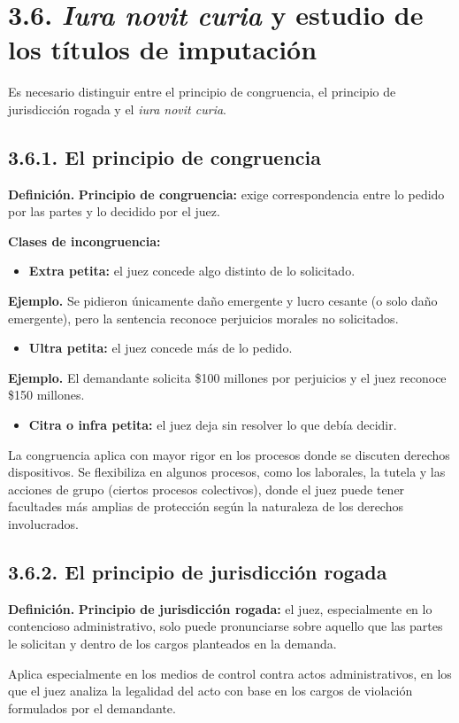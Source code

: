 \section{3.6. \textit{Iura novit curia} y estudio de los títulos de imputación}
Es necesario distinguir entre el principio de congruencia, el principio de jurisdicción rogada y el \textit{iura novit curia}.

\subsection{3.6.1. El principio de congruencia}
\begin{definicion}
\textcolor[HTML]{1F3864}{\textbf{Definición. }}\textbf{Principio de congruencia: }exige correspondencia entre lo pedido por las partes y lo decidido por el juez.
\end{definicion}
\textbf{Clases de incongruencia:}

\begin{itemize}
\item \textbf{Extra petita:} el juez concede algo distinto de lo solicitado.
\end{itemize}
\begin{ejemplo}
\textcolor[HTML]{4F6228}{\textbf{Ejemplo. }}Se pidieron únicamente daño emergente y lucro cesante (o solo daño emergente), pero la sentencia reconoce perjuicios morales no solicitados.
\end{ejemplo}
\begin{itemize}
\item \textbf{Ultra petita:} el juez concede más de lo pedido.
\end{itemize}
\begin{ejemplo}
\textcolor[HTML]{4F6228}{\textbf{Ejemplo. }}El demandante solicita \$100 millones por perjuicios y el juez reconoce \$150 millones.
\end{ejemplo}
\begin{itemize}
\item \textbf{Citra o infra petita:} el juez deja sin resolver lo que debía decidir.
\end{itemize}
La congruencia aplica con mayor rigor en los procesos donde se discuten derechos dispositivos. Se flexibiliza en algunos procesos, como los laborales, la tutela y las acciones de grupo (ciertos procesos colectivos), donde el juez puede tener facultades más amplias de protección según la naturaleza de los derechos involucrados.

\subsection{3.6.2. El principio de jurisdicción rogada}
\begin{definicion}
\textcolor[HTML]{1F3864}{\textbf{Definición. }}\textbf{Principio de jurisdicción rogada: }el juez, especialmente en lo contencioso administrativo, solo puede pronunciarse sobre aquello que las partes le solicitan y dentro de los cargos planteados en la demanda.
\end{definicion}
Aplica especialmente en los medios de control contra actos administrativos, en los que el juez analiza la legalidad del acto con base en los cargos de violación formulados por el demandante.


